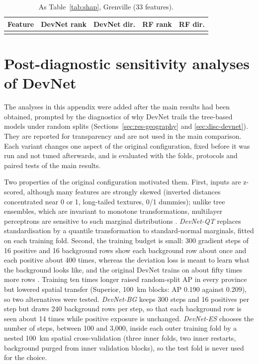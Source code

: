 \documentclass[pdflatex,sn-apa]{sn-jnl}
\begin{document}
\begin{appendices}
\begin{table}[!h]
\caption{As Table~\ref{tab:shap}, Grenville (33 features).}\label{tab:shap-gren}
\footnotesize
\begin{tabular*}{\textwidth}{@{\extracolsep\fill}lcccc}
\toprule
Feature & DevNet rank & DevNet dir. & RF rank & RF dir. \\
\midrule
\botrule
\end{tabular*}
\end{table}

\section{Post-diagnostic sensitivity analyses of DevNet}\label{app:sensitivity}

The analyses in this appendix were added after the main results had been obtained, prompted by the diagnostics of why DevNet trails the tree-based models under random splits (Sections~\ref{sec:res-geography} and \ref{sec:disc-devnet}). They are reported for transparency and are not used in the main comparison. Each variant changes one aspect of the original configuration, fixed before it was run and not tuned afterwards, and is evaluated with the folds, protocols and paired tests of the main results.

Two properties of the original configuration motivated them. First, inputs are z-scored, although many features are strongly skewed (inverted distances concentrated near 0 or 1, long-tailed textures, 0/1 dummies); unlike tree ensembles, which are invariant to monotone transformations, multilayer perceptrons are sensitive to such marginal distributions \citep{Gorishniy2021,Grinsztajn2022}. \emph{DevNet-QT} replaces standardisation by a quantile transformation to standard-normal marginals, fitted on each training fold. Second, the training budget is small: 300 gradient steps of 16 positive and 16 background rows show each background row about once and each positive about 400 times, whereas the deviation loss is meant to learn what the background looks like, and the original DevNet trains on about fifty times more rows \citep{Pang2019}. Training ten times longer raised random-split AP in every province but lowered spatial transfer (Superior, 100~km blocks: AP 0.190 against 0.209), so two alternatives were tested. \emph{DevNet-BG} keeps 300 steps and 16 positives per step but draws 240 background rows per step, so that each background row is seen about 14 times while positive exposure is unchanged. \emph{DevNet-ES} chooses the number of steps, between 100 and 3,000, inside each outer training fold by a nested 100~km spatial cross-validation (three inner folds, two inner restarts, background purged from inner validation blocks), so the test fold is never used for the choice.


\end{appendices}
\end{document}

